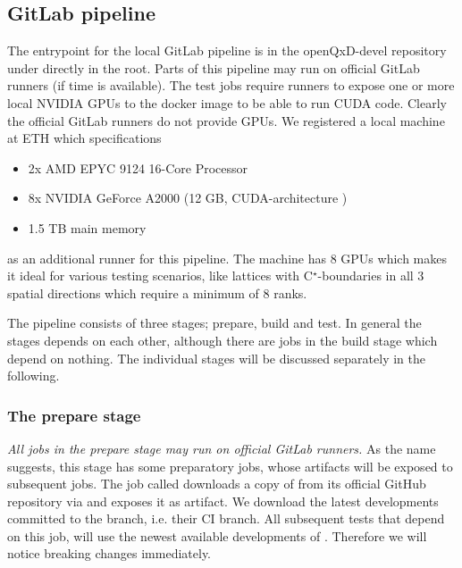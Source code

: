 \subsection{GitLab pipeline}
\label{sec:cicd:pipeline:gitlab}

The entrypoint for the local GitLab pipeline is in the openQxD-devel repository\cite{gitlab:openqxd-devel} under  directly in the root.
Parts of this pipeline may run on official GitLab runners (if time is available).
The test jobs require runners to expose one or more local NVIDIA GPUs to the docker image to be able to run CUDA code.
Clearly the official GitLab runners do not provide GPUs.
We registered a local machine at ETH which specifications
\begin{itemize}
    \item 2x AMD EPYC 9124 16-Core Processor
    \item 8x NVIDIA GeForce A2000 (12 GB, CUDA-architecture )
    \item 1.5 TB main memory
\end{itemize}
as an additional runner for this pipeline. The machine has 8 GPUs which makes it ideal for various testing scenarios, like lattices with C$^\star$-boundaries in all $3$ spatial directions which require a minimum of 8 ranks.

The pipeline consists of three stages; prepare, build and test.
In general the stages depends on each other, although there are jobs in the build stage which depend on nothing.
The individual stages will be discussed separately in the following.

\subsubsection{The prepare stage}

\emph{All jobs in the prepare stage may run on official GitLab runners.}
As the name suggests, this stage has some preparatory jobs, whose artifacts will be exposed to subsequent jobs.
The job called  downloads a copy of \quda from its official GitHub repository \cite{github:quda} via  and exposes it as artifact.
We download the latest developments committed to the  branch, i.e. their CI branch.
All subsequent tests that depend on this job, will use the newest available developments of \quda.
Therefore we will notice breaking changes immediately.

